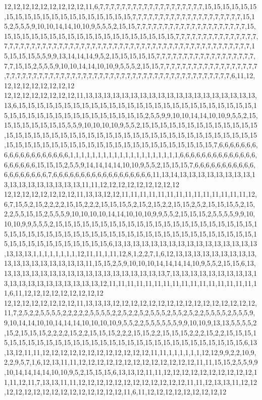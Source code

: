 12,12,12,12,12,12,12,12,12,11,6,7,7,7,7,7,7,7,7,7,7,7,7,7,7,7,7,7,7,7,15,15,15,15,15,15,15,15,15,15,15,15,15,15,15,15,15,15,15,15,7,7,7,7,7,7,7,7,7,7,7,7,7,7,7,7,7,7,7,7,15,15,2,5,5,5,9,10,10,14,14,10,10,9,5,5,5,2,15,15,7,7,7,7,7,7,7,7,7,7,7,7,7,7,7,7,7,7,7,7,15,15,15,15,15,15,15,15,15,15,15,15,15,15,15,15,15,15,15,15,7,7,7,7,7,7,7,7,7,7,7,7,7,7,7,7,7,7,7,7,7,7,7,7,7,7,7,7,7,7,7,7,7,7,7,7,7,7,7,7,7,7,7,7,7,7,7,7,7,7,7,7,7,7,7,7,7,7,7,7,15,15,15,15,5,5,9,9,13,14,14,14,9,5,2,15,15,15,15,15,7,7,7,7,7,7,7,7,7,7,7,7,7,7,7,7,7,7,7,7,15,15,2,5,5,5,9,10,10,14,14,10,10,9,5,5,5,2,15,15,7,7,7,7,7,7,7,7,7,7,7,7,7,7,7,7,7,7,7,7,7,7,7,7,7,7,7,7,7,7,7,7,7,7,7,7,7,7,7,7,7,7,7,7,7,7,7,7,7,7,7,7,7,7,7,7,7,7,7,6,11,12,12,12,12,12,12,12,12,12
12,12,12,12,12,12,12,12,11,13,13,13,13,13,13,13,13,13,13,13,13,13,13,13,13,13,13,13,13,6,15,15,15,15,15,15,15,15,15,15,15,15,15,15,15,15,15,15,15,15,15,15,15,15,15,15,15,15,15,15,15,15,15,15,15,15,15,15,15,15,15,15,2,5,5,9,9,10,10,14,14,10,10,9,5,5,2,15,15,15,15,15,15,15,15,5,5,9,10,10,10,10,9,5,5,2,15,15,15,15,15,15,15,15,15,15,15,15,15,15,15,15,15,15,15,15,15,15,15,15,15,15,15,15,15,15,15,15,15,15,15,15,15,15,15,15,15,15,15,15,15,15,15,15,15,15,15,15,15,15,15,15,15,15,15,15,15,15,15,15,7,6,6,6,6,6,6,6,6,6,6,6,6,6,6,6,6,6,6,6,1,1,1,1,1,1,1,1,1,1,1,1,1,1,1,1,1,1,1,1,6,6,6,6,6,6,6,6,6,6,6,6,6,6,6,6,6,6,6,6,15,15,15,2,5,5,9,14,14,14,14,10,10,9,5,5,2,15,15,15,7,6,6,6,6,6,6,6,6,6,6,6,6,6,6,6,6,6,6,6,7,6,6,6,6,6,6,6,6,6,6,6,6,6,6,6,6,6,6,11,13,14,13,13,13,13,13,13,13,13,13,13,13,13,13,13,13,13,13,11,11,12,12,12,12,12,12,12,12,12
12,12,12,12,12,12,12,12,11,13,13,12,12,11,11,11,11,11,11,11,11,11,11,11,11,11,11,12,6,7,15,5,2,15,2,2,2,2,15,15,2,2,2,15,15,15,5,2,15,2,15,2,2,15,15,2,5,2,15,15,15,5,2,15,2,2,5,5,15,15,2,5,5,5,9,10,10,10,10,14,14,10,10,10,9,9,5,5,2,15,15,15,2,5,5,5,5,9,9,10,10,10,9,9,5,5,5,2,15,15,15,15,15,15,15,15,15,15,15,15,15,15,15,15,15,15,15,15,15,15,15,15,15,15,15,15,15,15,15,15,15,15,15,15,15,15,15,15,15,15,15,15,15,15,15,15,15,15,15,15,15,15,15,15,15,15,15,15,15,15,6,13,13,13,13,13,13,13,13,13,13,13,13,13,13,13,13,13,13,13,1,1,1,1,1,1,1,1,12,11,11,1,11,12,8,1,2,2,7,1,6,12,13,13,13,13,13,13,13,13,13,13,13,13,13,13,13,13,13,13,11,15,15,2,5,9,10,10,10,14,14,14,14,10,9,5,5,2,15,15,6,13,13,13,13,13,13,13,13,13,13,13,13,13,13,13,13,13,13,13,7,13,13,13,13,13,13,13,13,13,13,13,13,13,13,13,13,13,13,13,13,12,11,11,11,11,11,11,11,11,11,11,11,11,11,11,11,11,11,6,11,12,12,12,12,12,12,12,12,12
12,12,12,12,12,12,12,12,11,13,13,13,12,12,12,12,12,12,12,12,12,12,12,12,12,12,12,12,11,7,2,5,2,2,5,5,5,5,2,2,2,2,2,5,5,5,5,2,2,5,2,2,5,2,5,5,5,2,5,5,2,5,2,2,5,5,5,5,2,5,5,5,9,9,10,14,14,10,10,14,14,14,10,10,10,10,9,5,5,2,2,5,5,5,5,5,5,9,9,10,10,9,13,13,5,5,5,5,2,15,2,15,15,15,2,2,2,2,15,2,2,15,15,15,2,2,2,15,15,2,2,15,15,15,2,2,2,15,2,2,15,15,15,15,15,15,15,15,15,15,15,15,15,15,15,15,15,15,15,15,15,15,15,15,15,15,15,15,15,15,6,13,13,12,11,11,12,12,12,12,12,12,12,12,12,12,12,12,11,11,1,1,1,1,1,1,12,12,9,9,2,2,10,9,2,2,9,5,7,1,6,12,13,11,11,12,12,12,12,12,12,12,12,12,12,12,12,12,11,11,15,15,2,5,5,9,9,10,14,14,14,14,10,10,9,5,2,15,15,15,6,13,13,12,11,11,12,12,12,12,12,12,12,12,12,12,11,11,12,11,7,13,13,11,11,12,12,12,12,12,12,12,12,12,12,12,12,11,11,12,13,13,11,12,12,12,12,12,12,12,12,12,12,12,12,12,12,12,11,6,11,12,12,12,12,12,12,12,12,12
